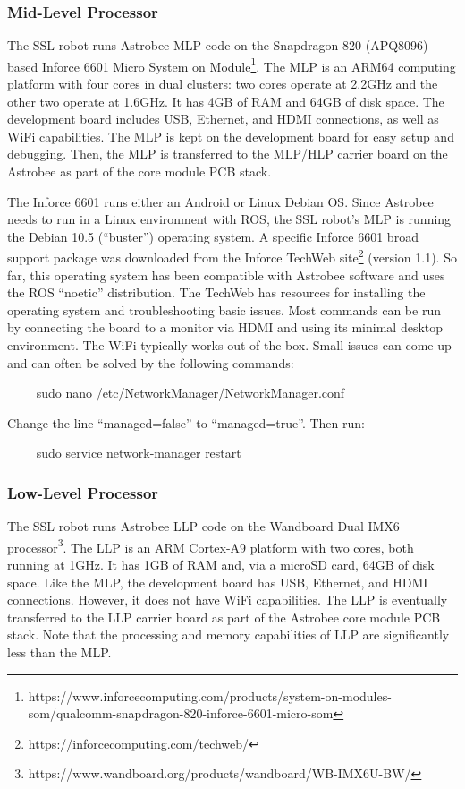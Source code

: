 \documentclass{article}
\begin{document}
\subsubsection{Mid-Level Processor}
The SSL robot runs Astrobee MLP code on the Snapdragon 820 (APQ8096) based Inforce 6601 Micro System on Module\footnote{https://www.inforcecomputing.com/products/system-on-modules-som/qualcomm-snapdragon-820-inforce-6601-micro-som}. The MLP is an ARM64 computing platform with four cores in dual clusters: two cores operate at 2.2GHz and the other two operate at 1.6GHz. It has 4GB of RAM and 64GB of disk space. The development board includes USB, Ethernet, and HDMI connections, as well as WiFi capabilities. The MLP is kept on the development board for easy setup and debugging. Then, the MLP is transferred to the MLP/HLP carrier board on the Astrobee as part of the core module PCB stack.

The Inforce 6601 runs either an Android or Linux Debian OS. Since Astrobee needs to run in a Linux environment with ROS, the SSL robot's MLP is running the Debian 10.5 (``buster'') operating system. A specific Inforce 6601 broad support package was downloaded from the Inforce TechWeb site\footnote{https://inforcecomputing.com/techweb/} (version 1.1). So far, this operating system has been compatible with Astrobee software and uses the ROS ``noetic'' distribution. The TechWeb has resources for installing the operating system and troubleshooting basic issues. Most commands can be run by connecting the board to a monitor via HDMI and using its minimal desktop environment. The WiFi typically works out of the box. Small issues can come up and can often be solved by the following commands:
\begin{markdown}
~~~~
sudo nano /etc/NetworkManager/NetworkManager.conf
~~~~
\end{markdown}
Change the line ``managed=false'' to ``managed=true''. Then run:
\begin{markdown}
~~~~
sudo service network-manager restart
~~~~
\end{markdown}


\subsubsection{Low-Level Processor}
The SSL robot runs Astrobee LLP code on the Wandboard Dual IMX6 processor\footnote{https://www.wandboard.org/products/wandboard/WB-IMX6U-BW/}. The LLP is an ARM Cortex-A9 platform with two cores, both running at 1GHz. It has 1GB of RAM and, via a microSD card, 64GB of disk space. Like the MLP, the development board has USB, Ethernet, and HDMI connections. However, it does not have WiFi capabilities. The LLP is eventually transferred to the LLP carrier board as part of the Astrobee core module PCB stack. Note that the processing and memory capabilities of LLP are significantly less than the MLP.
\end{document}
